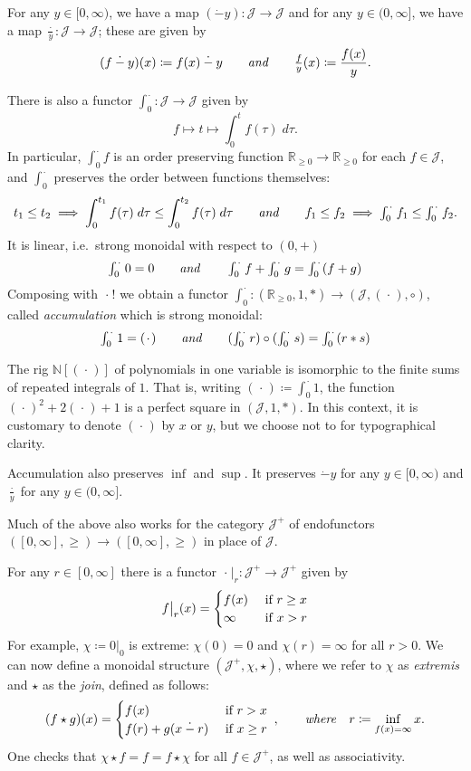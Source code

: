 \documentclass[11pt, one side, article]{memoir}
\theoremstyle{definition}
\theoremstyle{plain}
\newenvironment{remark}
  {\pushQED{\qed}\renewcommand{\qedsymbol}{$\lozenge$}\remarkx}
  {\popQED\endremarkx}
\newcommand{\cat}[1]{\mathcal{#1}}%
\newcommand{\id}{\mathrm{id}}
\newcommand{\tn}[1]{\textnormal{#1}}
\newcommand{\nn}{\mathbb{N}}
\newcommand{\rr}{\mathbb{R}}
\newcommand{\const}[1][\blank]{#1 !}
\newcommand{\blank}[1][1pt]{\hspace{#1}\cdot\hspace{#1}}
\newcommand{\rest}[2][\blank]{#1\big|_{#2}}
\newcommand{\hh}[2][]{#1 \tn{\textit{#2}} #1}
\newcommand{\qqand}{\hh[\qquad]{and}}
\newcommand{\hi}[4][]{#1 #2 \tn{\textit{#4}} #3}
\newcommand{\where}[1][,]{\hi[#1]{\qquad}{\quad}{where}}
\newcommand{\rrnon}{\rr_{\geq0}}
\newcommand{\dotminus}{\mathbin{\dot{-}}}
\renewcommand{\d}[1]{\;d #1}
\newcommand{\varint}{\textstyle\int}
\newcommand{\intzero}[1][\blank]{\varint_0^{#1}}
\newcommand{\xid}[1][\blank]{(#1)}
\begin{document}

For any $y\in[0,\infty)$, we have a map $(\dotminus y)\colon\cat{J}\to\cat{J}$ and for any $y\in(0,\infty]$, we have a map $\frac{\blank}{y}\colon\cat{J}\to\cat{J}$; these are given by
\[
	(f\dotminus y)(x)\coloneqq f(x)\dotminus y
	\qqand
	\textstyle\frac{f}{y}(x)\displaystyle\coloneqq \frac{f(x)}{y}.
\]

There is also a functor $\intzero\colon\cat{J}\to\cat{J}$ given by
\[
f\mapsto t\mapsto\int_0^t f(\tau) \d \tau.
\]
In particular, $\intzero f$ is an order preserving function $\rrnon\to\rrnon$ for each $f\in\cat{J}$, and $\intzero$ preserves the order between functions themselves:
\[
t_1\leq 
t_2
\implies 
\int_0^{t_1}f(\tau)\d\tau\leq
\int_0^{t_2}f(\tau)\d\tau
\qqand
f_1\leq 
f_2
\implies
\intzero f_1\leq
\intzero f_2.
\]
It is linear, i.e.\ strong monoidal with respect to $(0,+)$
\[
\intzero 0=0
\qqand
\intzero f+\intzero g=\intzero (f+g)
\]
Composing with $\const$ we obtain a functor $\intzero\colon(\rrnon,1,*)\to(\cat{J},\xid,\circ)$, called  \emph{accumulation} which is strong monoidal:
\[
\intzero 1=\xid
\qqand
(\intzero r)\circ(\intzero s)=\intzero(r*s)
\]

\begin{remark}
The rig $\nn[\xid]$ of polynomials in one variable is isomorphic to the finite sums of repeated integrals of $1$. That is, writing $\xid\coloneqq\intzero 1$, the function $\xid^2+2\xid+1$ is a perfect square in $(\cat{J},1,*)$. In this context, it is customary to denote $\xid$ by $x$ or $y$, but we choose not to for typographical clarity.
\end{remark}

Accumulation also preserves $\inf$ and $\sup$. It preserves $\dotminus y$ for any $y\in[0,\infty)$ and $\frac{\blank}{y}$ for any $y\in(0,\infty]$.

Much of the above also works for the category $\cat{J}^+$ of endofunctors $([0,\infty],\geq)\to([0,\infty],\geq)$ in place of $\cat{J}$. 

For any $r\in[0,\infty]$ there is a functor $\rest{r}\colon\cat{J}^+\to\cat{J}^+$ given by
\[
\rest[f]{r}(x)=
	\begin{cases}
		f(x)&\tn{ if }r\geq x\\
		\infty&\tn{ if } x>r
	\end{cases}
\]
For example, $\chi\coloneqq\rest[0]{0}$ is extreme: $\chi(0)=0$ and $\chi(r)=\infty$ for all $r>0$. 
We can now define a monoidal structure $(\cat{J}^+,\chi,\star)$, where we refer to $\chi$ as \emph{extremis} and $\star$ as the \emph{join}, defined as follows:
\[
(f\star g)(x)=
\begin{cases}
	f(x)&\tn{ if }r> x\\
	f(r)+g(x\dotminus r)&\tn{ if }x\geq r
\end{cases}
\;\where
r\coloneqq\inf_{f(x)=\infty}x.
\]
One checks that $\chi\star f=f=f\star\chi$ for all $f\in\cat{J}^+$, as well as associativity.
\end{document}
